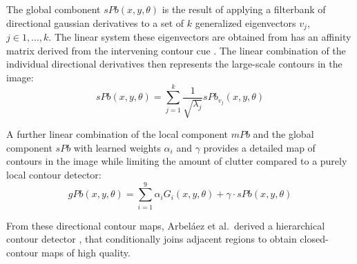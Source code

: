 The global combonent $sPb(x, y, \theta)$ is the result of applying a
filterbank of directional gaussian derivatives to a set of $k$ generalized
eigenvectors $v_j$, $j \in 1, \dots, k$. The linear system these eigenvectors are
obtained from has an affinity matrix derived from the intervening contour cue
\autocite{fowlkes_learning_2003}. The linear combination of the individual
directional derivatives then represents the large-scale contours in the image:
\begin{equation*}
    sPb(x, y, \theta) = \sum_{j=1}^k \frac{1}{\sqrt{\lambda_j}} sPb_{v_j}(x, y, \theta)
\end{equation*}

A further linear combination of the local component $mPb$ and the global
component $sPb$ with learned weights $\alpha_i$ and $\gamma$ provides a
detailed map of contours in the image while limiting the amount of clutter
compared to a purely local contour detector:
\begin{equation*}
    gPb(x, y, \theta) = \sum_{i=1}^9 \alpha_i G_i(x, y, \theta) + \gamma \cdot sPb(x, y, \theta)
\end{equation*}

From these directional contour maps, Arbeláez et al.\ derived a hierarchical
contour detector \autocite{arbelaez_contours_2009}, that conditionally joins
adjacent regions to obtain closed-contour maps of high quality.
